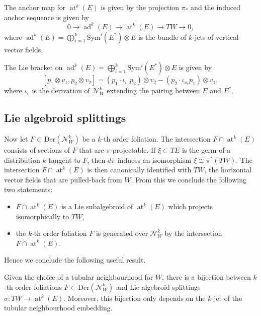 \documentclass[10pt]{amsart}
\DeclareMathOperator{\at}{at}
\DeclareMathOperator{\ad}{ad}
\numberwithin{theoremalpha}{section}
\numberwithin{equation}{section}
\numberwithin{definition}{section}
\numberwithin{theorem}{section}
\numberwithin{proposition}{section}
\numberwithin{lemma}{section}
\numberwithin{example}{section}
\numberwithin{remark}{section}
\numberwithin{corollary}{section}
\numberwithin{question}{section}
\numberwithin{problem}{section}
\numberwithin{assumption}{section}
\theoremstyle{named}
\numberwithin{equation}{section}
\begin{document}
The anchor map for $\at^{k}(E)$ is given by the projection $\pi_{*}$ and the induced anchor sequence is given by 
\begin{equation} \label{anchorsequence}
0 \to \ad^{k}(E) \to \at^{k}(E) \to TW \to 0,
\end{equation}
where $\ad^{k}(E) = \bigoplus_{i = 1}^{k}\mathrm{Sym}^{i}(E^*) \otimes E$ is the bundle of $k$-jets of vertical vector fields. 

\begin{lemma} \label{Explicitbracket}
The Lie bracket on $\ad^{k}(E) = \bigoplus_{i = 1}^{k}\mathrm{Sym}^{i}(E^*) \otimes E$ is given by 
\[
[p_{1} \otimes v_{1}, p_{2} \otimes v_{2}] = (p_{1} \cdot \iota_{v_{1}} p_{2}) \otimes v_{2} - (p_{2} \cdot \iota_{v_{2}} p_{1}) \otimes v_{1},
\]
where $\iota_{v}$ is the derivation of $\mathcal{N}_{W}^{k}$ extending the pairing between $E$ and $E^*$.  
\end{lemma}



\subsection{Lie algebroid splittings} \label{Liealgsplittings}

Now let $F \subset \mathrm{Der}(\mathcal{N}_{W}^{k})$ be a $k$-th order foliation. The intersection $F \cap \at^{k}(E)$ consists of sections of $F$ that are $\pi$-projectable. If $\xi \subset TE$ is the germ of a distribution $k$-tangent to $F$, then $d\pi$ induces an isomorphism $\xi \cong \pi^*(TW)$. The intersection $F \cap \at^{k}(E)$ is then canonically identified with $TW$, the horizontal vector fields that are pulled-back from $W$. From this we conclude the following two statements: 
\begin{itemize}
\item $F \cap \at^{k}(E)$ is a Lie subalgebroid of $\at^{k}(E)$ which projects isomorphically to $TW$,
\item the $k$-th order foliation $F$ is generated over $\mathcal{N}_{W}^{k}$ by the intersection $F \cap \at^{k}(E)$. 
\end{itemize} 
Hence we conclude the following useful result. 
\begin{theorem} \label{splittingprop}
Given the choice of a tubular neighbourhood for $W$, there is a bijection between $k$-th order foliations $F \subset \mathrm{Der}(\mathcal{N}_{W}^{k})$ and Lie algebroid splittings $\sigma : TW \to \at^{k}(E)$. Moreover, this bijection only depends on the $k$-jet of the tubular neighbourhood embedding.
\end{theorem}
\end{document}
